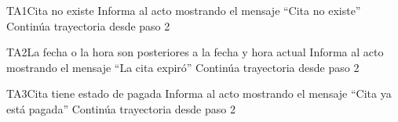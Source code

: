 \begin{UCtrayectoriaA}{TA1}{Cita no existe}
	\UCpaso Informa al acto mostrando el mensaje ``Cita no existe''
	\UCpaso Continúa trayectoria desde paso 2
	
\end{UCtrayectoriaA}
	
\begin{UCtrayectoriaA}{TA2}{La fecha o la hora son posteriores a la fecha y hora actual}
	\UCpaso Informa al acto mostrando el mensaje ``La cita expiró''
	\UCpaso Continúa trayectoria desde paso 2
	
\end{UCtrayectoriaA}

\begin{UCtrayectoriaA}{TA3}{Cita tiene estado de pagada}
	\UCpaso Informa al acto mostrando el mensaje ``Cita ya está pagada''
	\UCpaso Continúa trayectoria desde paso 2
	
\end{UCtrayectoriaA}
